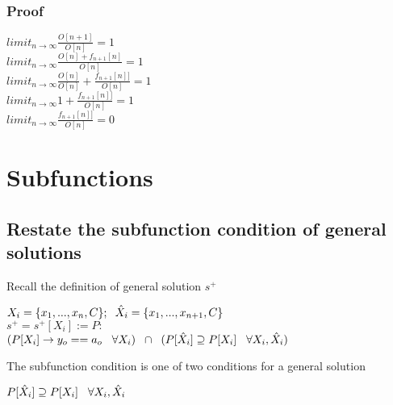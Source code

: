 \documentclass[11pt]{article}
\begin{document}
\subsubsection{Proof}
\begin{center}
$
limit_{n \rightarrow \infty } \frac{O[n+1]}{O[n]} = 1
$
\\ \vspace{2mm}
$
limit_{n \rightarrow \infty } \frac{O[n] + f_{n+1}[n]}{O[n]} = 1
$
\\ \vspace{2mm}
$
limit_{n \rightarrow \infty } \frac{O[n]}{O[n]}+  \frac{f_{n+1}[n]]}{O[n]}  = 1
$
\\ \vspace{2mm}
$
limit_{n \rightarrow \infty } 1 +  \frac{f_{n+1}[n]]}{O[n]}  = 1
$
\\ \vspace{2mm}
$
limit_{n \rightarrow \infty }  \frac{f_{n+1}[n]]}{O[n]}  = 0
$
\end{center}
















\newpage
\section{Subfunctions}





\subsection{Restate the subfunction condition of general solutions}
Recall the definition of general solution $s^+$
\begin{center}
$
X_i = \{x_1,...,x_n,C\}; \hspace{2mm} \hat{X}_i = \{x_1,...,x_{n+1},C\}
$
\\ \vspace{2mm}
$
s^+ = s^+[X_i] := P :
$
\\ \vspace{2mm}
$
(P \lbrack X_i \rbrack \rightarrow y_{o} == a_{o} \hspace{3mm} \forall X_i) \hspace{2mm} \cap \hspace{2mm} (P[\hat{X}_i] \supseteq P[X_i] \hspace{3mm} \forall X_i,\hat{X}_i)
$
\end{center}
\vspace{3mm}
The subfunction condition is one of two conditions for a general solution
\begin{center}
$
P[\hat{X}_i] \supseteq P[X_i] \hspace{3mm} \forall X_i,\hat{X}_i
$
\end{center}
\end{document}

